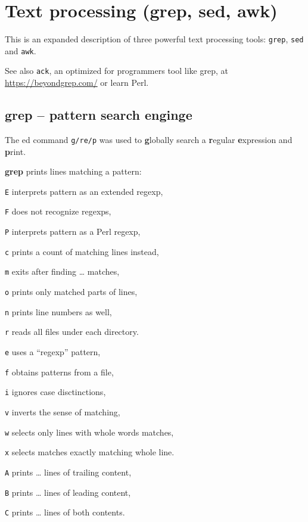 \section{Text processing (grep, sed, awk)}
This is an expanded description of three powerful text processing tools:
\texttt{grep}, \texttt{sed} and \texttt{awk}.

See also \texttt{ack}, an optimized for programmers tool like grep, at \url{https://beyondgrep.com/} or learn Perl.

\subsection{grep -- pattern search enginge}
The ed command \texttt{g/re/p} was used to \textbf{g}lobally search a \textbf{r}egular \textbf{e}xpression and \textbf{p}rint.
\begin{compactenum}
\item [\cmdvar] \textbf{grep} prints lines matching a pattern:
\item [\texttt{E}] interprets pattern as an extended regexp,
\item [\texttt{F}] does not recognize regexps,
\item [\texttt{P}] interprets pattern as a Perl regexp,
\item []
\item [\texttt{c}] prints a count of matching lines instead,
\item [\texttt{m}] exits after finding \ldots{} matches,
\item [\texttt{o}] prints only matched parts of lines,
\item [\texttt{n}] prints line numbers as well,
\item [\texttt{r}] reads all files under each directory.
\item []
\item [\texttt{e}] uses a ``regexp'' pattern,
\item [\texttt{f}] obtains patterns from a file,
\item [\texttt{i}] ignores case disctinctions,
\item [\texttt{v}] inverts the sense of matching,
\item [\texttt{w}] selects only lines with whole words matches,
\item [\texttt{x}] selects matches exactly matching whole line.
\item []
\item [\texttt{A}] prints \ldots{} lines of trailing content,
\item [\texttt{B}] prints \ldots{} lines of leading content,
\item [\texttt{C}] prints \ldots{} lines of both contents.
\end{compactenum}

